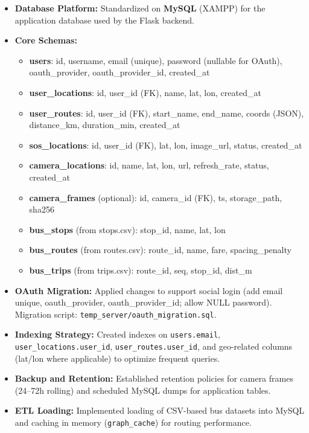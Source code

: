 \begin{itemize}
    \item \textbf{Database Platform:} Standardized on \textbf{MySQL} (XAMPP) for the application database used by the Flask backend.
    
    \item \textbf{Core Schemas:}
    \begin{itemize}
        \item \textbf{users}: id, username, email (unique), password (nullable for OAuth), oauth\_provider, oauth\_provider\_id, created\_at
        \item \textbf{user\_locations}: id, user\_id (FK), name, lat, lon, created\_at
        \item \textbf{user\_routes}: id, user\_id (FK), start\_name, end\_name, coords (JSON), distance\_km, duration\_min, created\_at
        \item \textbf{sos\_locations}: id, user\_id (FK), lat, lon, image\_url, status, created\_at
        \item \textbf{camera\_locations}: id, name, lat, lon, url, refresh\_rate, status, created\_at
        \item \textbf{camera\_frames} (optional): id, camera\_id (FK), ts, storage\_path, sha256
        \item \textbf{bus\_stops} (from stops.csv): stop\_id, name, lat, lon
        \item \textbf{bus\_routes} (from routes.csv): route\_id, name, fare, spacing\_penalty
        \item \textbf{bus\_trips} (from trips.csv): route\_id, seq, stop\_id, dist\_m
    \end{itemize}
    
    \item \textbf{OAuth Migration:} Applied changes to support social login (add email unique, oauth\_provider, oauth\_provider\_id; allow NULL password). Migration script: \texttt{temp\_server/oauth\_migration.sql}.
    
    \item \textbf{Indexing Strategy:} Created indexes on \texttt{users.email}, \texttt{user\_locations.user\_id}, \texttt{user\_routes.user\_id}, and geo-related columns (lat/lon where applicable) to optimize frequent queries.
    
    \item \textbf{Backup and Retention:} Established retention policies for camera frames (24–72h rolling) and scheduled MySQL dumps for application tables.
    
    \item \textbf{ETL Loading:} Implemented loading of CSV-based bus datasets into MySQL and caching in memory (\texttt{graph\_cache}) for routing performance.
\end{itemize}

